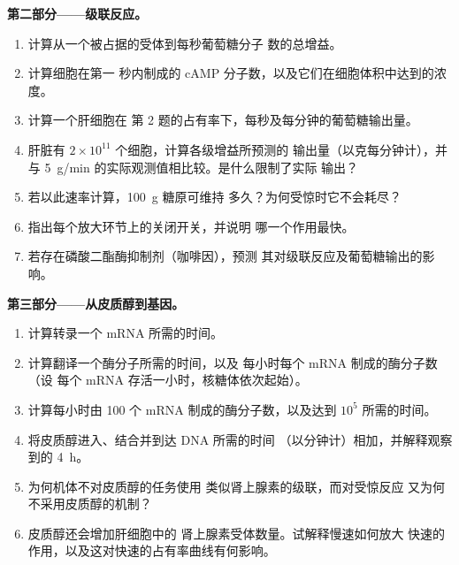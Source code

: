 \begin{problem}
\medskip
\noindent\textbf{第二部分——级联反应。}
\begin{enumerate}[resume]
  \item 计算从一个被占据的受体到每秒葡萄糖分子
        数的总增益。
  \item 计算细胞在第一
        秒内制成的 cAMP 分子数，以及它们在细胞体积中达到的浓度。
  \item 计算一个肝细胞在
        第 2 题的占有率下，每秒及每分钟的葡萄糖输出量。
  \item 肝脏有 $2\times 10^{11}$ 个细胞，计算各级增益所预测的
        输出量（以克每分钟计），并与
        \qty{5}{g/min} 的实际观测值相比较。是什么限制了实际
        输出？
  \item 若以此速率计算，\qty{100}{g} 糖原可维持
        多久？为何受惊时它不会耗尽？
  \item 指出每个放大环节上的关闭开关，并说明
        哪一个作用最快。
  \item 若存在磷酸二酯酶抑制剂（咖啡因），预测
        其对级联反应及葡萄糖输出的影响。
\end{enumerate}

\medskip
\noindent\textbf{第三部分——从皮质醇到基因。}
\begin{enumerate}[resume]
  \item 计算转录一个 mRNA 所需的时间。
  \item 计算翻译一个酶分子所需的时间，以及
        每小时每个 mRNA 制成的酶分子数（设
        每个 mRNA 存活一小时，核糖体依次起始）。
  \item 计算每小时由
        \num{100} 个 mRNA 制成的酶分子数，以及达到 $10^{5}$ 所需的时间。
  \item 将皮质醇进入、结合并到达 DNA 所需的时间
        （以分钟计）相加，并解释观察到的 \qty{4}{h}。
  \item 为何机体不对皮质醇的任务使用
        类似肾上腺素的级联，而对受惊反应
        又为何不采用皮质醇的机制？
  \item 皮质醇还会增加肝细胞中的
        肾上腺素受体数量。试解释慢速如何放大
        快速的作用，以及这对快速的占有率曲线有何影响。
\end{enumerate}


\end{problem}
